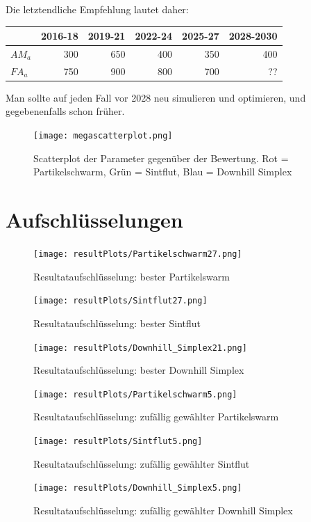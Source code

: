 \documentclass[a4paper,12pt]{article}
\begin{document}
Die letztendliche Empfehlung lautet daher:

\begin{center}
\begin{tabular}{| l | r | r | r | r | r |}
\hline
& 2016-18 & 2019-21 & 2022-24 & 2025-27 & 2028-2030 \\ \hline
$AM_a$ & 300 & 650 & 400 & 350 & 400 \\ \hline
$FA_a$ & 750 & 900 & 800 & 700 &  ?? \\ \hline
\end{tabular}
\end{center}

Man sollte auf jeden Fall vor 2028 neu simulieren und optimieren, und gegebenenfalls schon früher.

\begin{figure}[H]
\texttt{[image: megascatterplot.png]}
\caption{Scatterplot der Parameter gegenüber der Bewertung. Rot = Partikelschwarm, Grün = Sintflut, Blau = Downhill Simplex}
\label{fig:scatter}
\end{figure}

\newpage




\appendix

\section{Aufschlüsselungen}

\begin{figure}[h]
\texttt{[image: resultPlots/Partikelschwarm27.png]}
\caption{Resultataufschlüsselung: bester Partikelswarm}
\end{figure}

\begin{figure}[h]
\texttt{[image: resultPlots/Sintflut27.png]}
\caption{Resultataufschlüsselung: bester Sintflut}
\end{figure}

\begin{figure}[h]
\texttt{[image: resultPlots/Downhill\_Simplex21.png]}
\caption{Resultataufschlüsselung: bester Downhill Simplex}
\end{figure}


\begin{figure}[h]
\texttt{[image: resultPlots/Partikelschwarm5.png]}
\caption{Resultataufschlüsselung: zufällig gewählter Partikelswarm}
\end{figure}

\begin{figure}[h]
\texttt{[image: resultPlots/Sintflut5.png]}
\caption{Resultataufschlüsselung: zufällig gewählter Sintflut}
\end{figure}

\begin{figure}[h]
\texttt{[image: resultPlots/Downhill\_Simplex5.png]}
\caption{Resultataufschlüsselung: zufällig gewählter Downhill Simplex}
\end{figure}
\end{document}
